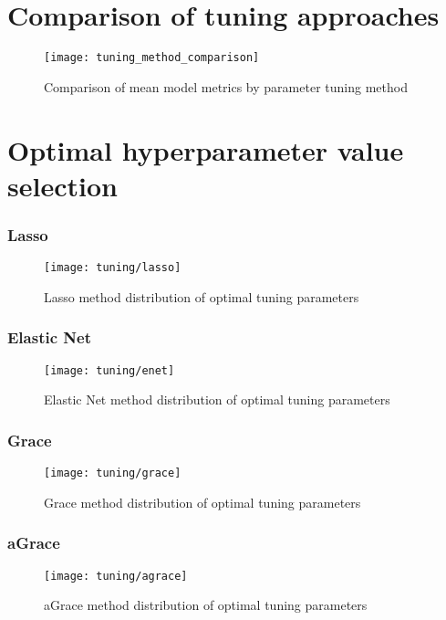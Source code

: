\section{Comparison of tuning approaches}

\begin{figure}[H]
	\centering
	\texttt{[image: tuning\_method\_comparison]}
	\caption{Comparison of mean model metrics by parameter tuning method}
	\label{fig:met_comparison}
\end{figure}

\section{Optimal hyperparameter value selection}

\subsubsection{Lasso}
\begin{figure}[H]
	\centering
	\texttt{[image: tuning/lasso]}
	\caption{Lasso method distribution of optimal tuning parameters}
	\label{fig:tun_lasso}
\end{figure}

\subsubsection{Elastic Net}
\begin{figure}[H]
	\centering
	\texttt{[image: tuning/enet]}
	\caption{Elastic Net method distribution of optimal tuning parameters}
	\label{fig:tun_enet}
\end{figure}

\subsubsection{Grace}
\begin{figure}[H]
	\centering
	\texttt{[image: tuning/grace]}
	\caption{Grace method distribution of optimal tuning parameters}
	\label{fig:tun_grace}
\end{figure}

\subsubsection{aGrace}
\begin{figure}[H]
	\centering
	\texttt{[image: tuning/agrace]}
	\caption{aGrace method distribution of optimal tuning parameters}
	\label{fig:tun_agrace}
\end{figure}

